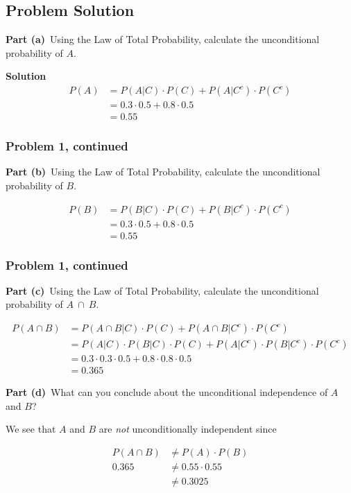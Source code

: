 \documentclass[12pt]{article}
\theoremstyle{definition}
\begin{document}
\subsection*{Problem Solution}

\bigskip
\noindent
{\bf Part (a)}\ Using the Law of Total Probability, calculate the unconditional probability of $A$.

\bigskip
\noindent
{\bf Solution}
\begin{align*}
P(A) &= P(A|C)\cdot P(C) + P(A|C^c)\cdot P(C^c)\\
&= 0.3 \cdot 0.5 + 0.8 \cdot 0.5\\
&= 0.55
\end{align*}

\newpage
\subsubsection*{Problem 1, continued}
\noindent
{\bf Part (b)}\ Using the Law of Total Probability, calculate the unconditional probability of $B$.

\begin{align*}
P(B) &= P(B|C) \cdot P(C) + P(B|C^c) \cdot P(C^c)\\
&= 0.3 \cdot 0.5 + 0.8 \cdot 0.5 \\
&= 0.55
\end{align*}

\newpage
\subsubsection*{Problem 1, continued}
{\bf Part (c)}\ Using the Law of Total Probability, calculate the unconditional probability of $A\ \cap\ B$.

\begin{align*}
P(A \cap B) &=  P(A \cap B|C) \cdot P(C) + P(A \cap B|C^c) \cdot P(C^c)\\
&= P(A|C) \cdot P(B|C) \cdot P(C) + P(A|C^c) \cdot P(B|C^c) \cdot P(C^c)\\
&= 0.3 \cdot 0.3 \cdot 0.5 + 0.8 \cdot 0.8 \cdot 0.5\\
&= 0.365
\end{align*}

\vspace{2.5in}
\noindent
{\bf Part (d)}\ What can you conclude about the unconditional independence of $A$ and $B$?

We see that $A$ and $B$ are \textit{not} unconditionally independent since

\begin{align*}
P(A \cap B) & \neq P(A) \cdot P(B) \\
0.365 & \neq 0.55 \cdot 0.55\\
 & \neq 0.3025
\end{align*}
\end{document}
